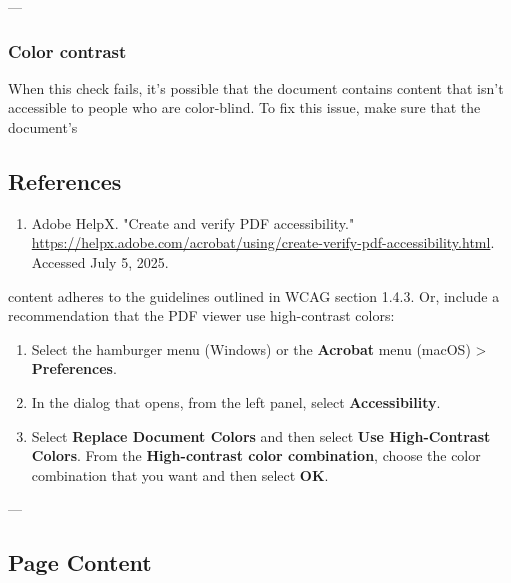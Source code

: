 ---

\subsubsection*{Color contrast}
When this check fails, it's possible that the document contains content that isn't accessible to people who are color-blind\footnotemark[1].
To fix this issue, make sure that the document's\vfill
\subsection*{References}
\begin{enumerate}
    \item Adobe HelpX. "Create and verify PDF accessibility." \url{https://helpx.adobe.com/acrobat/using/create-verify-pdf-accessibility.html}. Accessed July 5, 2025.
\end{enumerate}

 content adheres to the guidelines outlined in WCAG section 1.4.3. Or, include a recommendation that the PDF viewer use high-contrast colors:
\begin{enumerate}
    \item Select the hamburger menu (Windows) or the \textbf{Acrobat} menu (macOS) > \textbf{Preferences}.
    \item In the dialog that opens, from the left panel, select \textbf{Accessibility}.
    \item Select \textbf{Replace Document Colors} and then select \textbf{Use High-Contrast Colors}. From the \textbf{High-contrast color combination}, choose the color combination that you want and then select \textbf{OK}.
\end{enumerate}

---

\subsection*{Page Content}
